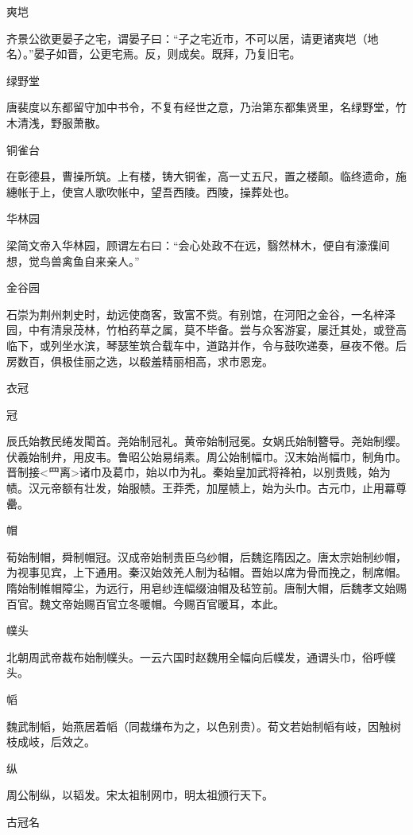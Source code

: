 \documentclass[a4paper,12pt,UTF8,twoside]{ctexbook}
\begin{document}
    爽垲
    
    齐景公欲更晏子之宅，谓晏子曰：“子之宅近市，不可以居，请更诸爽垲（地名）。”晏子如晋，公更宅焉。反，则成矣。既拜，乃复旧宅。
    
    绿野堂
    
    唐裴度以东都留守加中书令，不复有经世之意，乃治第东都集贤里，名绿野堂，竹木清浅，野服萧散。
    
    铜雀台
    
    在彰德县，曹操所筑。上有楼，铸大铜雀，高一丈五尺，置之楼颠。临终遗命，施繐帐于上，使宫人歌吹帐中，望吾西陵。西陵，操葬处也。
    
    华林园
    
    梁简文帝入华林园，顾谓左右曰：“会心处政不在远，翳然林木，便自有濠濮间想，觉鸟兽禽鱼自来亲人。”
    
    金谷园
    
    石崇为荆州刺史时，劫远使商客，致富不赀。有别馆，在河阳之金谷，一名梓泽园，中有清泉茂林，竹柏药草之属，莫不毕备。尝与众客游宴，屡迁其处，或登高临下，或列坐水滨，琴瑟笙筑合载车中，道路并作，令与鼓吹递奏，昼夜不倦。后房数百，俱极佳丽之选，以殽羞精丽相高，求市恩宠。
    
    衣冠
    
    冠
    
    辰氏始教民绻发閐首。尧始制冠礼。黄帝始制冠冕。女娲氏始制簪导。尧始制缨。伏羲始制弁，用皮韦。鲁昭公始易绢素。周公始制幅巾。汉末始尚幅巾，制角巾。晋制接<罒离>诸巾及葛巾，始以巾为礼。秦始皇加武将袶袙，以别贵贱，始为帻。汉元帝额有壮发，始服帻。王莽秃，加屋帻上，始为头巾。古元巾，止用羃尊罍。
    
    帽
    
    荀始制帽，舜制帽冠。汉成帝始制贵臣乌纱帽，后魏迄隋因之。唐太宗始制纱帽，为视事见宾，上下通用。秦汉始效羌人制为毡帽。晋始以席为骨而挽之，制席帽。隋始制帷帽障尘，为远行，用皂纱连幅缀油帽及毡笠前。唐制大帽，后魏孝文始赐百官。魏文帝始赐百官立冬暖帽。今赐百官暖耳，本此。
    
    幞头
    
    北朝周武帝裁布始制幞头。一云六国时赵魏用全幅向后幞发，通谓头巾，俗呼幞头。
    
    幍
    
    魏武制幍，始燕居着幍（同裁缣布为之，以色别贵）。荀文若始制幍有岐，因触树枝成岐，后效之。
    
    纵
    
    周公制纵，以韬发。宋太祖制网巾，明太祖颁行天下。
    
    古冠名
    
\end{document}
